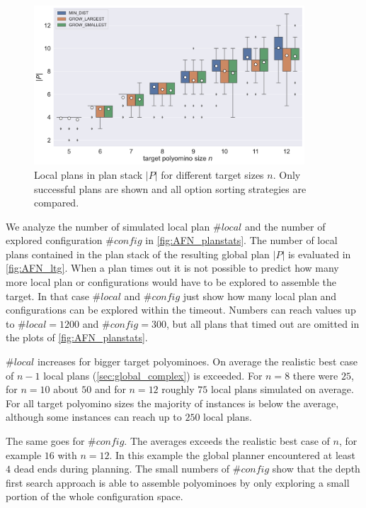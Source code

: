 \begin{figure}
	\centering
	\includegraphics[width=0.9\textwidth]{figures/plots/AFN_ltg.pdf}
	\caption[Local plans in plan stack for different target sizes]{Local plans in plan stack $|P|$ for different target sizes $n$. Only successful plans are shown and all option sorting strategies are compared.}
	\label{fig:AFN_ltg}
\end{figure}


We analyze the number of simulated local plan $\#\textit{local}$ and the number of explored configuration $\#\textit{config}$ in \autoref{fig:AFN_planstats}.
The number of local plans contained in the plan stack of the resulting global plan $|P|$ is evaluated in \autoref{fig:AFN_ltg}.
When a plan times out it is not possible to predict how many more local plan or configurations would have to be explored to assemble the target.
In that case $\#\textit{local}$ and $\#\textit{config}$ just show how many local plan and configurations can be explored within the timeout.
Numbers can reach values up to $\#\textit{local} = 1200$ and $\#\textit{config} = 300$, but all plans that timed out are omitted in the plots of \autoref{fig:AFN_planstats}.

$\#\textit{local}$ increases for bigger target polyominoes.
On average the realistic best case of $n-1$ local plans (\autoref{sec:global_complex}) is exceeded.
For $n=8$ there were $25$, for $n=10$ about $50$ and for $n=12$ roughly $75$ local plans simulated on average.
For all target polyomino sizes the majority of instances is below the average, although some instances can reach up to $250$ local plans.

The same goes for $\#\textit{config}$.
The averages exceeds the realistic best case of $n$, for example $16$ with $n=12$.
In this example the global planner encountered at least $4$ dead ends during planning.
The small numbers of $\#\textit{config}$ show that the depth first search approach is able to assemble polyominoes by only exploring a small portion of the whole configuration space.

